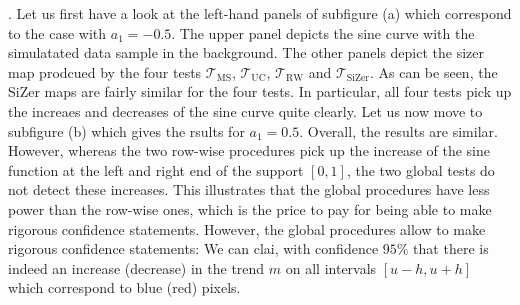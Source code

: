 . Let us first have a look at the left-hand panels of subfigure (a) which correspond to the case with $a_1=-0.5$. The upper panel depicts the sine curve with the simulatated data sample in the background. The other panels depict the sizer map prodcued by the four tests $\mathcal{T}_{\text{MS}}$, $\mathcal{T}_{\text{UC}}$, $\mathcal{T}_{\text{RW}}$ and $\mathcal{T}_{\text{SiZer}}$. As can be seen, the SiZer maps are fairly similar for the four tests. In particular, all four tests pick up the increaes and decreases of the sine curve quite clearly. Let us now move to subfigure (b) which gives the rsults for $a_1=0.5$. Overall, the results are similar. However, whereas the two row-wise procedures pick up the increase of the sine function at the left and right end of the support $[0,1]$, the two global tests do not detect these increases. This illustrates that the global procedures have less power than the row-wise ones, which is the price to pay for being able to make rigorous confidence statements. However, the global procedures allow to make rigorous confidence statements: We can clai, with confidence $95\%$ that there is indeed an increase (decrease) in the trend $m$ on all intervals $[u-h,u+h]$ which correspond to blue (red) pixels.


  



